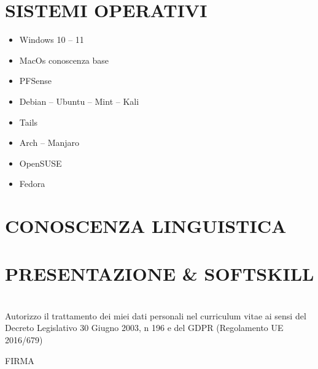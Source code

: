 \documentclass{clean_cv}
\begin{document}
    \section{SISTEMI OPERATIVI}
        \begin{multicols}{3}
            \begin{itemize}
                \item Windows 10 -- 11
                \item MacOs conoscenza base
                \item PFSense
                \item Debian -- Ubuntu -- Mint -- Kali
                \item Tails
                \item Arch -- Manjaro
                \item OpenSUSE
                \item Fedora
            \end{itemize}
        \end{multicols}
    
    \section{CONOSCENZA LINGUISTICA}
        \begin{datetabular}{9em}
        \end{datetabular}

    \newpage

    \section{PRESENTAZIONE \& SOFTSKILL}
        

    \vfill
    \section{}
        Autorizzo il trattamento dei miei dati personali nel curriculum vitae ai sensi del Decreto Legislativo 30 Giugno 2003, n 196 e del GDPR (Regolamento UE 2016/679)
        
        \vspace{2.5cm}
        FIRMA
\end{document}
